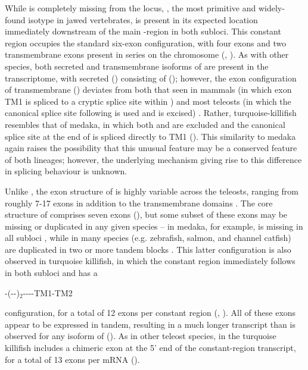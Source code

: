 	While  is completely missing from the \Nfu \igh{} locus, , the most primitive and widely-found isotype in jawed vertebrates, is present in its expected location immediately downstream of the main \jh-region in both subloci. This constant region occupies the standard six-exon configuration, with four \cm{} exons and two transmembrane exons present in series on the chromosome (, ). As with other species, both secreted and transmembrane isoforms of  are present in the transcriptome, with secreted  () consisting of  (); however, the exon configuration of transmembrane  () deviates from both that seen in mammals (in which exon TM1 is spliced to a cryptic splice site within ) and most teleosts (in which the canonical splice site following  is used and  is excised) \parencite{fillatreau2013astonishing}. Rather, turquoise-killifish  resembles that of medaka, in which both  and  are excluded and the canonical splice site at the end of  is spliced directly to TM1 (). This similarity to medaka again raises the possibility that this unusual feature may be a conserved feature of both lineages; however, the underlying mechanism giving rise to this difference in splicing behaviour is unknown.
	
		Unlike , the exon structure of  is highly variable across the teleosts, ranging from roughly 7-17 \cd{} exons in addition to the transmembrane domains \parencite{fillatreau2013astonishing}. The core structure of  comprises seven \cd{} exons (), but some subset of these exons may be missing or duplicated in any given species -- in medaka, for example,  is missing in all subloci \parencite{magadan2011medaka}, while in many species (e.g. zebrafish, salmon, and channel catfish)  are duplicated in two or more tandem blocks \parencite{fillatreau2013astonishing}. This latter configuration is also observed in turquoise killifish, in which the  constant region immediately follows  in both subloci and has a 

-(--)$_2$----TM1-TM2 

	\noindent configuration, for a total of 12 exons per  constant region (, ). All of these exons appear to be expressed in tandem, resulting in a much longer transcript than is observed for any isoform of  (). As in other teleost species,  in the turquoise killifish includes a chimeric  exon at the 5' end of the constant-region transcript, for a total of 13 exons per  mRNA ().

